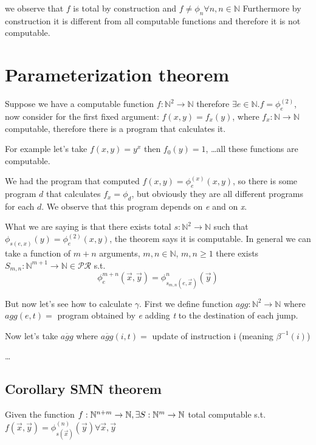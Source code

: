 \documentclass{amsbook}
\newcommand{\nat}{\ensuremath{\mathbb{N}}}
\theoremstyle{definition}
\theoremstyle{remark}
\numberwithin{section}{chapter}
\numberwithin{equation}{chapter}
\begin{document}
we observe that $f$ is total by construction and $ f \not= \phi_n \forall n, n \in \nat $ Furthermore by construction it is different from all computable functions and therefore it is not computable.

\chapter {Parameterization theorem}

Suppose we have a computable function $ f:\nat^2\rightarrow\nat$ therefore $ \exists e \in \nat . f = \phi_e^{(2)} $, now consider for the first fixed argument: $ f(x,y) = f_x(y) $, where $ f_x:\nat\rightarrow\nat $ computable, therefore there is a program that calculates it.

For example let's take $ f(x,y) = y^x $ then $ f_0(y) = 1 $, \dots all these functions are computable.

We had the program that computed $ f(x,y) = \phi_e^{(x)}(x,y) $, so there is some program $d$ that calculates $ f_x = \phi_d $, but obviously they are all different programs for each $d$. We observe that this program depends on \textit{e} and on \textit{x}.

What we are saying is that there exists total $ s:\nat^2\rightarrow\nat$ such that $ \phi_{s(e,x)}(y) = \phi_e^{(2)}(x,y)$, the theorem says it is computable. In general we can take a function of $ m+n $ arguments, $ m,n \in \nat $, $ m,n \geq 1 $ there exists $ S_{m,n} : \nat^{m+1}\rightarrow\nat \in \mathcal{PR}$ s.t. \begin{equation*}
	\phi_e^{m+n}(\vec{x},\vec{y}) = \phi_{s_{m,n}(e, \vec{x})}^{n}(\vec{y})
\end{equation*}

But now let's see how to calculate $ \gamma $. First we define function $ agg:\nat^2\rightarrow\nat $ where $ agg(e,t) =$ program obtained by \textit{e} adding \textit{t} to the destination of each jump.

Now let's take $ \overline{agg} $ where $ \overline{agg}(i,t) = $ update of instruction i (meaning $ \beta^{-1}(i) $)

\dots

\section {Corollary SMN theorem}
Given the function $ f:\nat^{n+m}\rightarrow\nat,\\ \exists S:\nat^m\rightarrow\nat $ total computable s.t. $ f(\vec{x},\vec{y}) = \phi_{s(\vec{x})}^{(n)}(\vec{y}) \forall \vec{x},\vec{y}$
\end{document}

